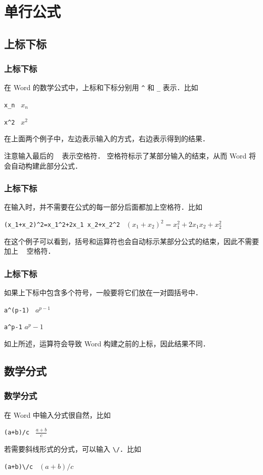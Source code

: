 \documentclass[12pt,notheorems,xcolor={rgb}]{beamer}
\let\lst=\lstinline
\newenvironment{framex}{\begin{frame}[fragile=singleslide,environment=framex]}{\end{frame}}
\begin{document}
\section{单行公式}

\subsection{上标下标}

\begin{framex}
\frametitle{上标下标}
在 Word 的数学公式中，上标和下标分别用 \lst!^! 和  \lst!_! 表示．比如
\begin{exampleh}
\lst!x_n ! \tcblower $x_n$
\end{exampleh}
\begin{exampleh}
\lst!x^2 ! \tcblower $x^2$
\end{exampleh}
在上面两个例子中，左边表示输入的方式，右边表示得到的结果．
\par
注意输入最后的 \lst! ! 表示空格符．
空格符标示了某部分输入的结束，从而 Word 将会自动构建此部分公式．
\end{framex}

\begin{framex}
\frametitle{上标下标}
在输入时，并不需要在公式的每一部分后面都加上空格符．比如
\begin{examplev}
\lst!(x_1+x_2)^2=x_1^2+2x_1 x_2+x_2^2 !
\tcblower
$(x_1+x_2)^2=x_1^2+2x_1x_2+x_2^2$
\end{examplev}
在这个例子可以看到，括号和运算符也会自动标示某部分公式的结束，因此不需要加上 \lst! ! 空格符．
\end{framex}

\begin{framex}
\frametitle{上标下标}
如果上下标中包含多个符号，一般要将它们放在一对圆括号中．
\begin{exampleh}
\lst!a^(p-1) ! \tcblower $a^{p-1}$
\end{exampleh}
\begin{exampleh}
\lst!a^p-1! \tcblower $a^p-1$
\end{exampleh}
如上所述，运算符会导致 Word 构建之前的上标，因此结果不同．
\end{framex}

\subsection{数学分式}

\begin{framex}
\frametitle{数学分式}
在 Word 中输入分式很自然，比如
\begin{exampleh}
\lst!(a+b)/c ! \tcblower $\frac{a+b}{c}$
\end{exampleh}
若需要斜线形式的分式，可以输入 \lst!\/!．比如
\begin{exampleh}
\lst!(a+b)\/c ! \tcblower $(a+b)/c$
\end{exampleh}
\end{framex}
\end{document}
